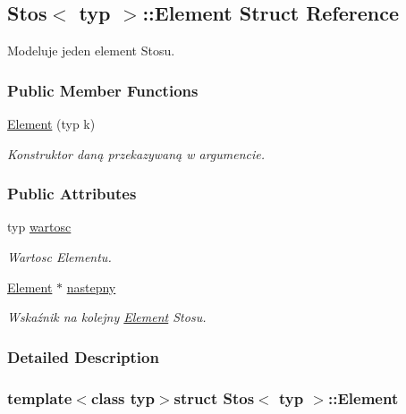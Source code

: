 \hypertarget{struct_stos_1_1_element}{\subsection{Stos$<$ typ $>$\-:\-:Element Struct Reference}
\label{struct_stos_1_1_element}
}


Modeluje jeden element Stosu.  


\subsubsection*{Public Member Functions}
\begin{DoxyCompactItemize}
\item 
\hyperlink{struct_stos_1_1_element_ad8988cce03414dd9d5e30cab360cf967}{Element} (typ k)
\begin{DoxyCompactList}\small\item\em Konstruktor daną przekazywaną w argumencie. \end{DoxyCompactList}\end{DoxyCompactItemize}
\subsubsection*{Public Attributes}
\begin{DoxyCompactItemize}
\item 
typ \hyperlink{struct_stos_1_1_element_aefe1cc964fd3a547e0a1d15fd18664a1}{wartosc}
\begin{DoxyCompactList}\small\item\em Wartosc Elementu. \end{DoxyCompactList}\item 
\hyperlink{struct_stos_1_1_element}{Element} $\ast$ \hyperlink{struct_stos_1_1_element_aaaa5c442792656418b009469940c6473}{nastepny}
\begin{DoxyCompactList}\small\item\em Wskaźnik na kolejny \hyperlink{struct_stos_1_1_element}{Element} Stosu. \end{DoxyCompactList}\end{DoxyCompactItemize}


\subsubsection{Detailed Description}
\subsubsection*{template$<$class typ$>$struct Stos$<$ typ $>$\-::\-Element}

